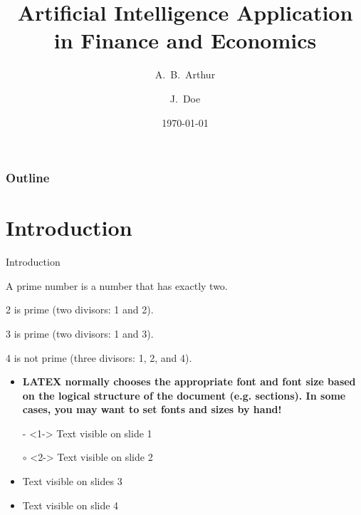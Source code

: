 \documentclass[10pt]{beamer}
\title{Artificial Intelligence Application in Finance and Economics}
\author[Arthur, Doe] %
{A.~B.~Arthur\inst{1} \and J.~Doe\inst{2}}
\institute[VFU] %
{
	\inst{1}%
	Faculty of Physics\\
	Very Famous University
	\and
	\inst{2}%
	Faculty of Chemistry\\
	Very Famous University
}
\date{\today}
\newcommand\Background{%
	\begin{tikzpicture}[remember picture,overlay]
		\node[inner sep=0pt,outer sep=0pt,opacity=0.1]
		at (current page.center)
		{\texttt{[image: img/bg]}};
	\end{tikzpicture}
}
\begin{document}
	
	\begin{frame}
		\initclock %
		\titlepage
	\end{frame}
	
	\begin{frame}
		\frametitle{Outline}
		\tableofcontents
	\end{frame}

	\section{Introduction}
	\begin{frame}{Introduction}
		\begin{definition}
			\small {A \alert{prime number} is a number that has exactly two.}
		\end{definition}
		
		\begin{example}
			\begin{itemize}
				\small{
				\item 2 is prime (two divisors: 1 and 2).
				\item 3 is prime (two divisors: 1 and 3).
				\item 4 is not prime (\alert{three} divisors: 1, 2, and 4).}
			\end{itemize}
		\end{example}
		\begin{itemize}
			\setbeamertemplate{itemize items}[ball]
			
			\item {\small \bf LATEX normally chooses the appropriate font and font size based on the logical structure of the document (e.g. sections). In some cases, you may want to set fonts and sizes by hand!}
			\item[-]<1-> Text visible on slide 1
			\item[$\circ$]<2-> Text visible on slide 2
			\item<3> Text visible on slides 3
			\item<4-> Text visible on slide 4
		\end{itemize}
	\end{frame}
\end{document}
